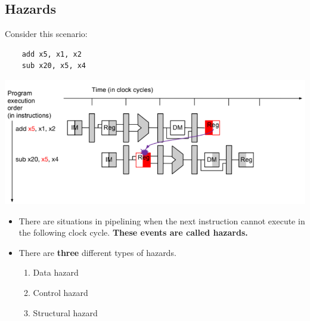 \documentclass[10pt]{article}
\begin{document}
\subsection*{Hazards}
Consider this scenario:
\begin{verbatim}
    add x5, x1, x2
    sub x20, x5, x4
\end{verbatim}
\begin{center}
    \includegraphics*[scale=0.8]{W3_7.png}
\end{center}
\begin{itemize}
    \item There are situations in pipelining when the next instruction cannot execute in the following clock cycle.  \textbf{These events are called hazards.}
    \item There are \textbf{three} different types of hazards.
    \begin{enumerate}
        \item Data hazard
        \item Control hazard
        \item Structural hazard
    \end{enumerate}
\end{itemize}
\end{document}

